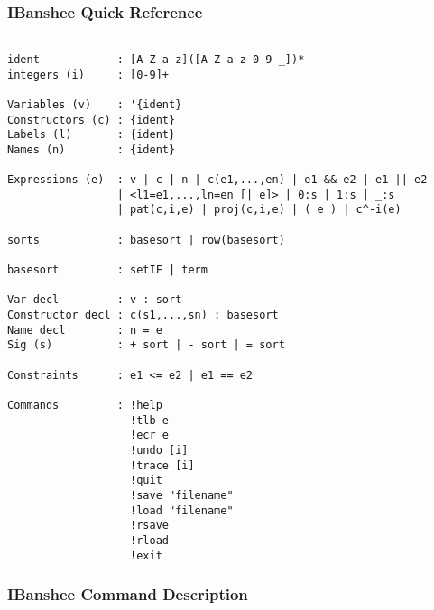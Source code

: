 \documentclass{article}
\begin{document}
\subsubsection{IBanshee Quick Reference}
\begin{verbatim}

ident            : [A-Z a-z]([A-Z a-z 0-9 _])*
integers (i)     : [0-9]+

Variables (v)    : '{ident}
Constructors (c) : {ident}
Labels (l)       : {ident}
Names (n)        : {ident}

Expressions (e)  : v | c | n | c(e1,...,en) | e1 && e2 | e1 || e2
                 | <l1=e1,...,ln=en [| e]> | 0:s | 1:s | _:s
                 | pat(c,i,e) | proj(c,i,e) | ( e ) | c^-i(e)

sorts            : basesort | row(basesort)

basesort         : setIF | term

Var decl         : v : sort
Constructor decl : c(s1,...,sn) : basesort
Name decl        : n = e 
Sig (s)          : + sort | - sort | = sort

Constraints      : e1 <= e2 | e1 == e2

Commands         : !help
                   !tlb e
                   !ecr e
                   !undo [i]
                   !trace [i]
                   !quit
                   !save "filename"
                   !load "filename"
                   !rsave
                   !rload
                   !exit
\end{verbatim}

\subsubsection{IBanshee Command Description}
\end{document}
